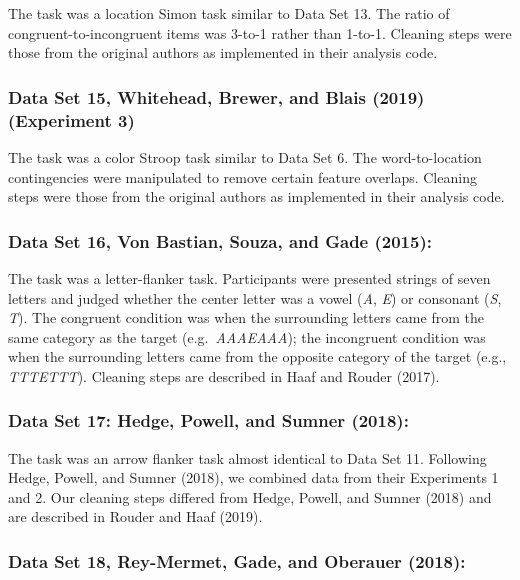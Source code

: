 \documentclass[
  english,
  ,man]{apa6}
\begin{document}
The task was a location Simon task similar to Data Set 13. The ratio of congruent-to-incongruent items was 3-to-1 rather than 1-to-1. Cleaning steps were those from the original authors as implemented in their analysis code.

\hypertarget{data-set-15-whitehead.etal.2019-experiment-3}{%
\subsubsection{Data Set 15, Whitehead, Brewer, and Blais (2019) (Experiment 3)}\label{data-set-15-whitehead.etal.2019-experiment-3}}

The task was a color Stroop task similar to Data Set 6. The word-to-location contingencies were manipulated to remove certain feature overlaps. Cleaning steps were those from the original authors as implemented in their analysis code.

\hypertarget{data-set-16-vonbastianetal2015}{%
\subsubsection{Data Set 16, Von Bastian, Souza, and Gade (2015):}\label{data-set-16-vonbastianetal2015}}

The task was a letter-flanker task. Participants were presented strings of seven letters and judged whether the center letter was a vowel (\emph{A}, \emph{E}) or consonant (\emph{S}, \emph{T}). The congruent condition was when the surrounding letters came from the same category as the target (e.g.~\emph{AAAEAAA}); the incongruent condition was when the surrounding letters came from the opposite category of the target (e.g., \emph{TTTETTT}). Cleaning steps are described in Haaf and Rouder (2017).

\hypertarget{data-set-17-hedgeetal2018}{%
\subsubsection{Data Set 17: Hedge, Powell, and Sumner (2018):}\label{data-set-17-hedgeetal2018}}

The task was an arrow flanker task almost identical to Data Set 11. Following Hedge, Powell, and Sumner (2018), we combined data from their Experiments 1 and 2. Our cleaning steps differed from Hedge, Powell, and Sumner (2018) and are described in Rouder and Haaf (2019).

\hypertarget{data-set-18-reymermetetal2018}{%
\subsubsection{Data Set 18, Rey-Mermet, Gade, and Oberauer (2018):}\label{data-set-18-reymermetetal2018}}
\end{document}
